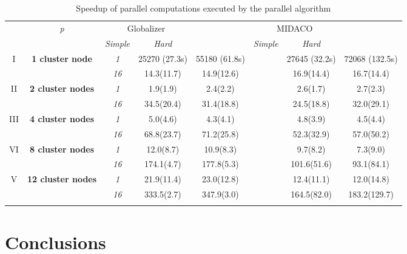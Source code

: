 \documentclass{svproc}
\begin{document}
\begin{Russian}
\begin{table}
  \centering
  \caption{Speedup of parallel computations executed by the parallel algorithm}
  \label{tab:speedup}
  \begin{tabular}{cccccccc}
    \cline{3-8}\noalign{\smallskip}
    \multicolumn{2}{c}{  } & \textit{p} & \multicolumn{2}{c}{Globalizer} & &
\multicolumn{2}{c}{MIDACO}   \\
    \noalign{\smallskip} \cline{4-5} \cline{7-8}  \noalign{\smallskip}
    \multicolumn{2}{c}{  } & & \textit{Simple} & \textit{Hard} & & \textit{Simple} &
\textit{Hard}  \\
    \noalign{\smallskip}\hline
I  & \textbf{1 cluster node}  %
    & \textit{1}   & 25270 (27.3s) & 55180 (61.8s) & & 27645 (32.2s) & 72068 (132.5s)  \\
  &  & \textit{16} & 14.3(11.7) & 14.9(12.6)  & &  16.9(14.4) & 16.7(14.4) \\
  \hline \noalign{\smallskip}
II  & \textbf{2 cluster nodes}  %
  & \textit{1}      &   1.9(1.9) & 2.4(2.2)  & & 2.6(1.7) & 2.7(2.3) \\
  &   & \textit{16} & 34.5(20.4) & 31.4(18.8) & & 24.5(18.8) & 32.0(29.1) \\
    \noalign{\smallskip}\hline	\noalign{\smallskip}
III  & \textbf{4 cluster nodes}  %
& \textit{1}      & 5.0(4.6) & 4.3(4.1) & & 4.8(3.9) & 4.5(4.4) \\
&   & \textit{16} & 68.8(23.7) & 71.2(25.8) & & 52.3(32.9) & 57.0(50.2) \\
  \noalign{\smallskip}\hline	\noalign{\smallskip}
VI & \textbf{8 cluster nodes} %
& \textit{1}    & 12.0(8.7) & 10.9(8.3) & & 9.7(8.2)    & 7.3(9.0)    \\
& & \textit{16} & 174.1(4.7) & 177.8(5.3) & & 101.6(51.6) & 93.1(84.1) \\
    \noalign{\smallskip}\hline
    V & \textbf{12 cluster nodes} %
    & \textit{1}    & 21.9(11.4)  & 23.0(12.8)  & & 12.4(11.1)  & 12.0(14.8)  \\
    & & \textit{16} & 333.5(2.7) & 347.9(3.0) & & 164.5(82.0) & 183.2(129.7) \\
        \noalign{\smallskip}\hline
  \end{tabular}
\end{table}

\section{Conclusions}


\end{Russian}
\end{document}
